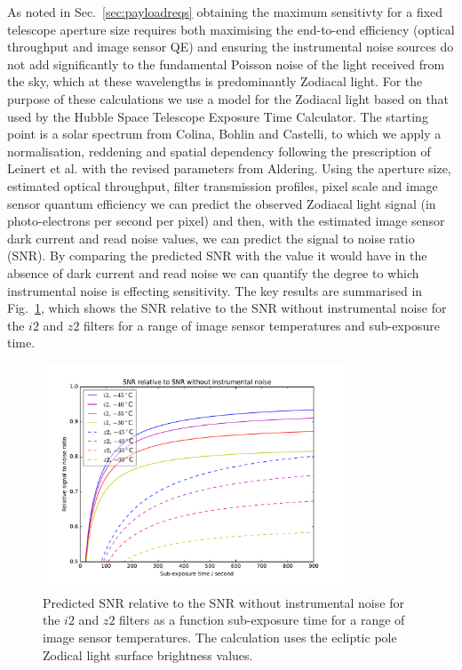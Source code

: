 \documentclass[]{iac}
\begin{document}
As noted in Sec.~\ref{sec:payloadreqs} obtaining the maximum sensitivty for a fixed telescope aperture size requires
both maximising the end-to-end efficiency (optical throughput and image sensor QE) and ensuring the instrumental noise
sources do not add significantly to the fundamental Poisson noise of the light received from the sky, which at these
wavelengths is predominantly Zodiacal light. For the purpose of these calculations we use a model for the Zodiacal light
based on that used by the Hubble Space Telescope Exposure Time Calculator\cite{Giavalisco2002}. The starting point is a
solar spectrum from Colina, Bohlin and Castelli\cite{Colina1996}, to which we apply a normalisation, reddening and
spatial dependency following the prescription of Leinert et al.\cite{Leinert1998} with the revised parameters from
Aldering\cite{Aldering2001}. Using the aperture size, estimated optical throughput, filter transmission profiles, pixel
scale and image sensor quantum efficiency we can predict the observed Zodiacal light signal (in photo-electrons per
second per pixel) and then, with the estimated image sensor dark current and read noise values, we can predict the
signal to noise ratio (SNR). By comparing the predicted SNR with the value it would have in the absence of dark current
and read noise we can quantify the degree to which instrumental noise is effecting sensitivity. The key results are
summarised in Fig.~\ref{fig:relsnr}, which shows the SNR relative to the SNR without instrumental noise for the $i2$ and
$z2$ filters for a range of image sensor temperatures and sub-exposure time.

\begin{figure}[tbp]
  \center \includegraphics[width=0.8\textwidth]{figures/relsnr.pdf}
  \caption{\label{fig:relsnr}Predicted SNR relative to the SNR without instrumental noise for the $i2$ and $z2$ filters
    as a function sub-exposure time for a range of image sensor temperatures. The calculation uses the ecliptic pole
    Zodical light surface brightness values.}
\end{figure}
\end{document}
